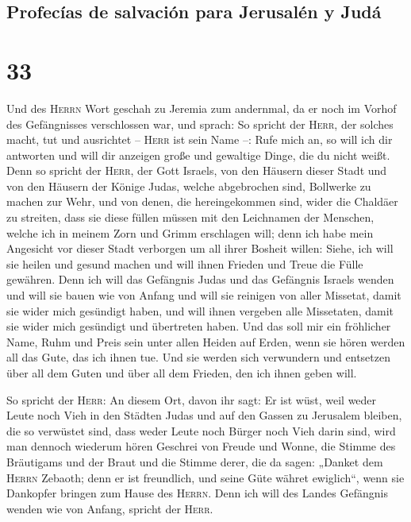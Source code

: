 \hypertarget{profecuxedas-de-salvaciuxf3n-para-jerusaluxe9n-y-juduxe1}{%
\subsection{Profecías de salvación para Jerusalén y
Judá}\label{profecuxedas-de-salvaciuxf3n-para-jerusaluxe9n-y-juduxe1}}

\hypertarget{section-32}{%
\section{33}\label{section-32}}

 Und des \textsc{Herrn} Wort geschah zu Jeremia zum
andernmal, da er noch im Vorhof des Gefängnisses verschlossen war, und
sprach:  So spricht der \textsc{Herr}, der solches macht,
tut und ausrichtet -- \textsc{Herr} ist sein Name --: 
Rufe mich an, so will ich dir antworten und will dir anzeigen große und
gewaltige Dinge, die du nicht weißt.  Denn so spricht der
\textsc{Herr}, der Gott Israels, von den Häusern dieser Stadt und von
den Häusern der Könige Judas, welche abgebrochen sind, Bollwerke zu
machen zur Wehr,  und von denen, die hereingekommen sind,
wider die Chaldäer zu streiten, dass sie diese füllen müssen mit den
Leichnamen der Menschen, welche ich in meinem Zorn und Grimm erschlagen
will; denn ich habe mein Angesicht vor dieser Stadt verborgen um all
ihrer Bosheit willen:  Siehe, ich will sie heilen und
gesund machen und will ihnen Frieden und Treue die Fülle gewähren.
 Denn ich will das Gefängnis Judas und das Gefängnis
Israels wenden und will sie bauen wie von Anfang  und will
sie reinigen von aller Missetat, damit sie wider mich gesündigt haben,
und will ihnen vergeben alle Missetaten, damit sie wider mich gesündigt
und übertreten haben.  Und das soll mir ein fröhlicher
Name, Ruhm und Preis sein unter allen Heiden auf Erden, wenn sie hören
werden all das Gute, das ich ihnen tue. Und sie werden sich verwundern
und entsetzen über all dem Guten und über all dem Frieden, den ich ihnen
geben will.

 So spricht der \textsc{Herr}: An diesem Ort, davon ihr
sagt: Er ist wüst, weil weder Leute noch Vieh in den Städten Judas und
auf den Gassen zu Jerusalem bleiben, die so verwüstet sind, dass weder
Leute noch Bürger noch Vieh darin sind,  wird man dennoch
wiederum hören Geschrei von Freude und Wonne, die Stimme des Bräutigams
und der Braut und die Stimme derer, die da sagen: „Danket dem
\textsc{Herrn} Zebaoth; denn er ist freundlich, und seine Güte währet
ewiglich``, wenn sie Dankopfer bringen zum Hause des \textsc{Herrn}.
Denn ich will des Landes Gefängnis wenden wie von Anfang, spricht der
\textsc{Herr}.

